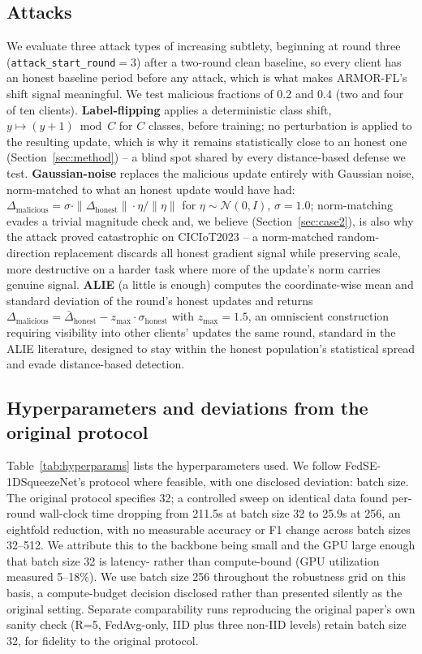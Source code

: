 \documentclass[pdflatex,iicol,sn-mathphys-num]{sn-jnl}%
\theoremstyle{thmstyleone}%
\theoremstyle{thmstyletwo}%
\theoremstyle{thmstylethree}%
\begin{document}
\subsection{Attacks}\label{sec:attackimpl}

We evaluate three attack types of increasing subtlety, beginning at round three (\texttt{attack\_start\_round}$=3$) after a two-round clean baseline, so every client has an honest baseline period before any attack, which is what makes ARMOR-FL's shift signal meaningful. We test malicious fractions of 0.2 and 0.4 (two and four of ten clients). \textbf{Label-flipping} applies a deterministic class shift, $y \mapsto (y + 1) \bmod C$ for $C$ classes, before training; no perturbation is applied to the resulting update, which is why it remains statistically close to an honest one (Section~\ref{sec:method}) -- a blind spot shared by every distance-based defense we test. \textbf{Gaussian-noise} replaces the malicious update entirely with Gaussian noise, norm-matched to what an honest update would have had: $\Delta_{\mathrm{malicious}} = \sigma \cdot \|\Delta_{\mathrm{honest}}\| \cdot \eta / \|\eta\|$ for $\eta \sim \mathcal{N}(0, I)$, $\sigma=1.0$; norm-matching evades a trivial magnitude check and, we believe (Section~\ref{sec:case2}), is also why the attack proved catastrophic on CICIoT2023 -- a norm-matched random-direction replacement discards all honest gradient signal while preserving scale, more destructive on a harder task where more of the update's norm carries genuine signal. \textbf{ALIE} (a little is enough) \citep{baruch2019alie} computes the coordinate-wise mean and standard deviation of the round's honest updates and returns $\Delta_{\mathrm{malicious}} = \bar{\Delta}_{\mathrm{honest}} - z_{\max} \cdot \sigma_{\mathrm{honest}}$ with $z_{\max}=1.5$, an omniscient construction requiring visibility into other clients' updates the same round, standard in the ALIE literature, designed to stay within the honest population's statistical spread and evade distance-based detection.

\subsection{Hyperparameters and deviations from the original protocol}\label{sec:hyperparams}

Table~\ref{tab:hyperparams} lists the hyperparameters used. We follow FedSE-1DSqueezeNet's protocol \citep{zhou2026fedse1dsqueezenet} where feasible, with one disclosed deviation: batch size. The original protocol specifies 32; a controlled sweep on identical data found per-round wall-clock time dropping from 211.5s at batch size 32 to 25.9s at 256, an eightfold reduction, with no measurable accuracy or F1 change across batch sizes 32--512. We attribute this to the backbone being small and the GPU large enough that batch size 32 is latency- rather than compute-bound (GPU utilization measured 5--18\%). We use batch size 256 throughout the robustness grid on this basis, a compute-budget decision disclosed rather than presented silently as the original setting. Separate comparability runs reproducing the original paper's own sanity check (R=5, FedAvg-only, IID plus three non-IID levels) retain batch size 32, for fidelity to the original protocol.
\end{document}
